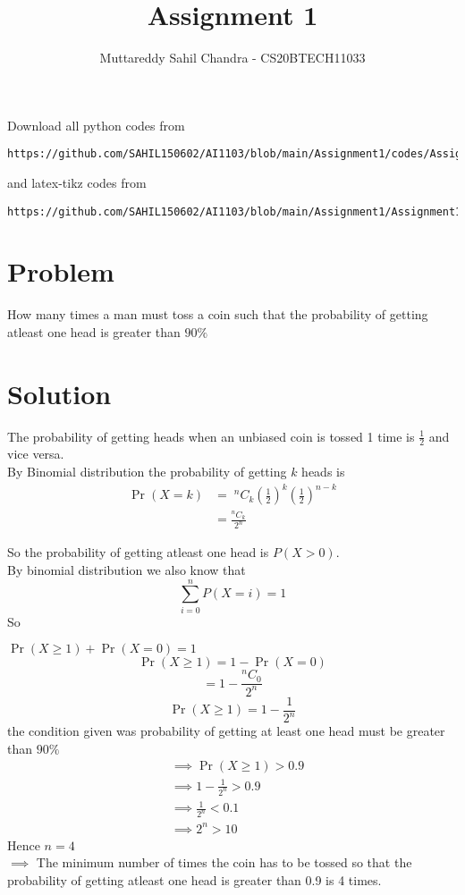 \documentclass[journal,12pt,twocolumn]{IEEEtran}
\begin{document}
\title{Assignment 1}
\author{Muttareddy Sahil Chandra - CS20BTECH11033}
\maketitle
\newpage
\bigskip
\renewcommand{\thefigure}{\theenumi}
\renewcommand{\thetable}{\theenumi}
Download all python codes from 
\begin{lstlisting}
https://github.com/SAHIL150602/AI1103/blob/main/Assignment1/codes/Assignment.py
\end{lstlisting}
%
and latex-tikz codes from 
%
\begin{lstlisting}
https://github.com/SAHIL150602/AI1103/blob/main/Assignment1/Assignment1.tex
\end{lstlisting}
\section{Problem}
How many times a man must toss a coin such that the probability of getting atleast one head is greater than $90\%$
\section{Solution} 
The probability of getting heads when an unbiased coin is tossed 1 time  is {\large$\frac{1}{2}$}  and  vice versa.
  \\By Binomial distribution the probability of getting $k$ heads is
  \begin{equation}
      \begin{split}
        \Pr(X = k) & =\;  ^nC_k \left(\frac{1}{2}\right)^k \left(\frac{1}{2}\right)^{n-k}\\   & =\frac{^nC_k}{2^n}  
      \end{split}
  \end{equation}
     
  So the probability of getting atleast one head is $P(X>0) $.\\
  By binomial distribution we also know that 
  \[\sum_{i=0}^{n}P(X=i)=1\]
  So    \;\;\;\;\;\;\;\;\;\;\;\;\;
  
  $\Pr(X\ge 1) + \Pr(X=0)=1$
  $$\Pr(X\ge 1) = 1-\Pr(X=0)$$
  $$= 1-\frac{^nC_0}{2^n}$$
  $$\Pr(X\ge 1) =1- \frac{1}{2^n}$$
  the condition given was probability of getting at least one head must be greater than  $90\%$
 \begin{align}
      &\implies \Pr(X\ge 1)>0.9\\
      &\implies 1-\frac{1}{2^n}>0.9\\
      &\implies\frac{1}{2^n}<0.1\\
      &\implies 2^n>10
  \end{align}
  Hence $n =4$\\
$\implies$ The minimum number of times the coin has to be tossed so that the probability  of getting atleast one head is greater than 0.9 is 4 times.    
\end{document}
